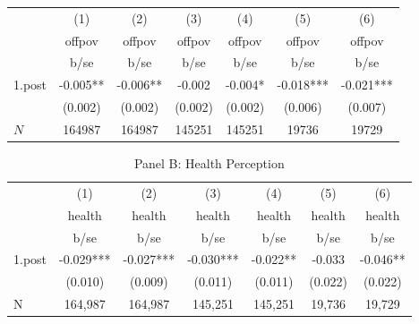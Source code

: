 {
\def\sym#1{\ifmmode^{#1}\else\(^{#1}\)\fi}
\begin{tabular}{l*{6}{c}}
            &\multicolumn{1}{c}{(1)}&\multicolumn{1}{c}{(2)}&\multicolumn{1}{c}{(3)}&\multicolumn{1}{c}{(4)}&\multicolumn{1}{c}{(5)}&\multicolumn{1}{c}{(6)}\\
            &\multicolumn{1}{c}{offpov}&\multicolumn{1}{c}{offpov}&\multicolumn{1}{c}{offpov}&\multicolumn{1}{c}{offpov}&\multicolumn{1}{c}{offpov}&\multicolumn{1}{c}{offpov}\\
            &        b/se   &        b/se   &        b/se   &        b/se   &        b/se   &        b/se   \\
1.post#1.treat&      -0.005** &      -0.006** &      -0.002   &      -0.004*  &      -0.018***&      -0.021***\\
            &     (0.002)   &     (0.002)   &     (0.002)   &     (0.002)   &     (0.006)   &     (0.007)   \\
\(N\)       &      164987   &      164987   &      145251   &      145251   &       19736   &       19729   \\
\end{tabular}
}
\begin{table}[htbp]\centering
\def\sym#1{\ifmmode^{#1}\else\(^{#1}\)\fi}
\caption{Panel B: Health Perception}
\begin{tabular}{l*{6}{c}}
\hline\hline
            &\multicolumn{1}{c}{(1)}&\multicolumn{1}{c}{(2)}&\multicolumn{1}{c}{(3)}&\multicolumn{1}{c}{(4)}&\multicolumn{1}{c}{(5)}&\multicolumn{1}{c}{(6)}\\
            &\multicolumn{1}{c}{health}&\multicolumn{1}{c}{health}&\multicolumn{1}{c}{health}&\multicolumn{1}{c}{health}&\multicolumn{1}{c}{health}&\multicolumn{1}{c}{health}\\
            &        b/se   &        b/se   &        b/se   &        b/se   &        b/se   &        b/se   \\
\hline
1.post#1.treat&      -0.029***&      -0.027***&      -0.030***&      -0.022** &      -0.033   &      -0.046** \\
            &     (0.010)   &     (0.009)   &     (0.011)   &     (0.011)   &     (0.022)   &     (0.022)   \\
\hline
N           &     164,987   &     164,987   &     145,251   &     145,251   &      19,736   &      19,729   \\
\hline\hline
\end{tabular}
\end{table}
